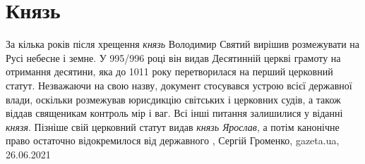  
 
 
 
 
\chapter{Князь}

За кілька років після хрещення \emph{князь} Володимир Святий вирішив розмежувати на
Русі небесне і земне. У 995/996 році він видав Десятинній церкві грамоту на
отримання десятини, яка до 1011 року перетворилася на перший церковний статут.
Незважаючи на свою назву, документ стосувався устрою всієї державної влади,
оскільки розмежував юрисдикцію світських і церковних судів, а також віддав
священикам контроль мір і ваг. Всі інші питання залишилися у віданні \emph{князя}.
Пізніше свій церковний статут видав \emph{князь Ярослав}, а потім канонічне право
остаточно відокремилося від державного
, 
Сергій Громенко, gazeta.ua, 26.06.2021

